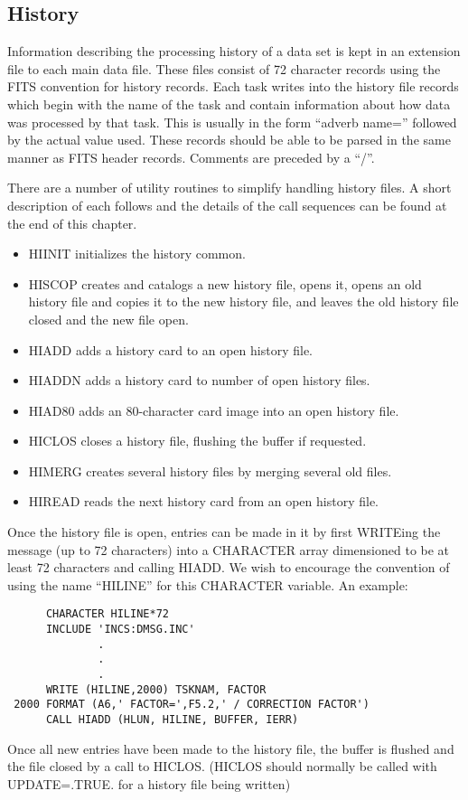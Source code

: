 \subsection{History}
Information describing the  processing history of a data set is kept
in an extension file to each main data file. These files consist of 72
character records using the FITS convention for history records.  Each
task writes into the history file records which begin with the name of
the task and contain information about how data was processed by that
task.  This is usually in the form ``adverb name='' followed by the
actual value used.  These records should be able to be parsed in the
same manner as FITS header records.  Comments are preceded by a ``/''.

There are a number of utility routines to simplify handling history
files.  A short description of each follows and the details of the
call sequences can be found at the end of this chapter.
\begin{itemize} %
\item {}
HIINIT initializes the history common.
\item {}
HISCOP creates and catalogs a new history file, opens it, opens an
old history file and copies it to the new history file, and leaves the
old history file closed and the new file open.
\item {}
HIADD adds a history card to an open history file.
\item {}
HIADDN adds a history card to number of open history files.
\item {}
HIAD80 adds an 80-character card image into an open history file.
\item {}
HICLOS closes a history file, flushing the buffer if requested.
\item {}
HIMERG creates several history files by merging several old files.
\item {}
HIREAD reads the next history card from an open history file.

\end{itemize} %
 Once the history file is open, entries can be made in it by first
WRITEing the message (up to 72 characters) into a CHARACTER array
dimensioned to be at least 72 characters and calling HIADD.  We wish to
encourage the convention of using the name ``HILINE'' for this
CHARACTER variable.  An example:
\smallskip
\begin{verbatim}
      CHARACTER HILINE*72
      INCLUDE 'INCS:DMSG.INC'
              .
              .
              .
      WRITE (HILINE,2000) TSKNAM, FACTOR
 2000 FORMAT (A6,' FACTOR=',F5.2,' / CORRECTION FACTOR')
      CALL HIADD (HLUN, HILINE, BUFFER, IERR)

\end{verbatim}
Once all new entries have been made to the history file, the buffer is
flushed and the file closed by a call to HICLOS.  (HICLOS should
normally be called with UPDATE=.TRUE. for a history file being
written)

